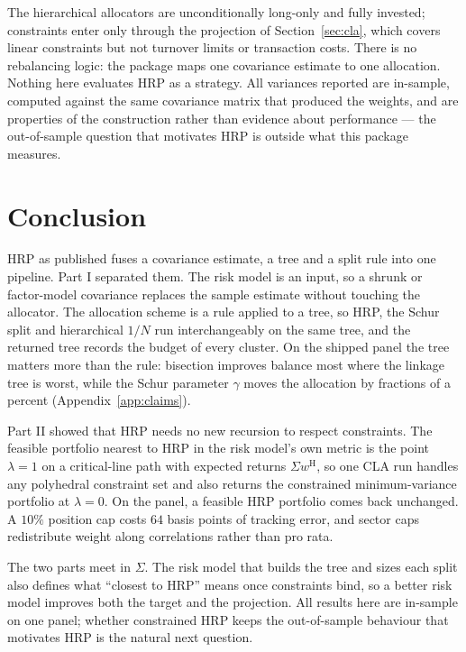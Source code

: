\documentclass[11pt,a4paper]{article}
\begin{document}
The hierarchical allocators are unconditionally long-only and fully invested;
constraints enter only through the projection of Section~\ref{sec:cla}, which
covers linear constraints but not turnover limits or transaction costs. There is
no rebalancing logic: the package maps one covariance estimate to one
allocation. Nothing here evaluates HRP as a strategy. All
variances reported are in-sample, computed against the same covariance matrix
that produced the weights, and are properties of the construction rather than
evidence about performance --- the out-of-sample question that motivates HRP
\citep{lopezdeprado2016} is outside what this package measures.

\section{Conclusion}

HRP as published fuses a covariance estimate, a tree and a split rule into one
pipeline. Part I separated them. The risk model is an input, so a shrunk or
factor-model covariance replaces the sample estimate without touching the
allocator. The allocation scheme is a rule applied to a tree, so HRP, the Schur
split and hierarchical $1/N$ run interchangeably on the same tree, and the
returned tree records the budget of every cluster. On the shipped panel the
tree matters more than the rule: bisection improves balance most where the
linkage tree is worst, while the Schur parameter $\gamma$ moves the allocation
by fractions of a percent (Appendix~\ref{app:claims}).

Part II showed that HRP needs no new recursion to respect constraints. The
feasible portfolio nearest to HRP in the risk model's own metric is the point
$\lambda = 1$ on a critical-line path with expected returns
$\Sigma w^{\mathrm{H}}$, so one CLA run handles any polyhedral constraint set
and also returns the constrained minimum-variance portfolio at $\lambda = 0$.
On the panel, a feasible HRP portfolio comes back unchanged. A $10\%$ position
cap costs $64$ basis points of tracking error, and sector caps redistribute
weight along correlations rather than pro rata.

The two parts meet in $\Sigma$. The risk model that builds the tree and sizes
each split also defines what ``closest to HRP'' means once constraints bind,
so a better risk model improves both the target and the projection. All results
here are in-sample on one panel; whether constrained HRP keeps the
out-of-sample behaviour that motivates HRP is the natural next question.
\end{document}
